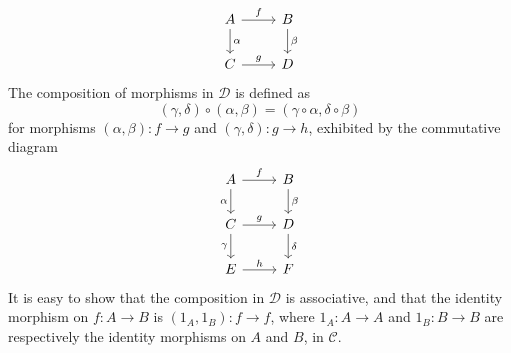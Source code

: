 \documentclass{article}
\begin{document}
\begin{Rmk}{}
\begin{compactenum}
        $$ \begin{tikzcd}
            A \arrow[r, "f"] \arrow[d, "\alpha"] & B \arrow[d, "\beta"] \\
            C \arrow[r, "g"] & D 
        \end{tikzcd} $$
        \textcolor{Df}{The composition of morphisms in $\mathscr{D}$ is defined as}
        $$ (\gamma, \delta) \circ (\alpha, \beta) = (\gamma \circ \alpha, \delta \circ \beta) $$
        \textcolor{Df}{for morphisms $(\alpha, \beta): f\to g$ and $(\gamma, \delta): g\to h$, exhibited by the commutative diagram}
        $$ \begin{tikzcd}
            A \arrow[r, "f"] \arrow[d, "\alpha"'] & B \arrow[d, "\beta"] \\
            C \arrow[r, "g"] \arrow[d, "\gamma"'] & D \arrow[d, "\delta"] \\
            E \arrow[r, "h"] & F
        \end{tikzcd} $$
        \textcolor{Th}{It is easy to show that the composition in $\mathscr{D}$ is associative, and that the identity morphism on $f: A \to B$ is $(1_A, 1_B): f \to f$, where $1_A: A \to A$ and $1_B: B \to B$ are respectively the identity morphisms on $A$ and $B$, in $\mathscr{C}$.}
    \end{compactenum}
\end{Rmk}
\end{document}
